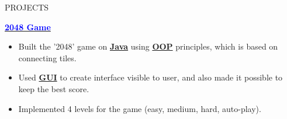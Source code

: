 \documentclass{resume} %
\begin{document}
\begin{rSection}{PROJECTS}
\item \href{https://github.com/turysbekovg/2048_project}{\textcolor{blue}{\textbf{2048 Game}} {\textcolor{black}{\small \faExternalLink}}} 
\vspace{-5pt} \item {} \hspace{0cm}  \hspace{0cm} 
\begin{itemize}
    \itemsep -5pt 
     \item Built the '2048' game on \underline {\textbf{Java}} using \underline{\textbf{OOP}} principles, which is based on connecting tiles.
     \item Used \underline {\textbf{GUI}} to create interface visible to user, and also made it possible to keep the best score.
     \item Implemented 4 levels for the game (easy, medium, hard, auto-play). 
 \end{itemize}
 
\end{rSection} 
\end{document}
